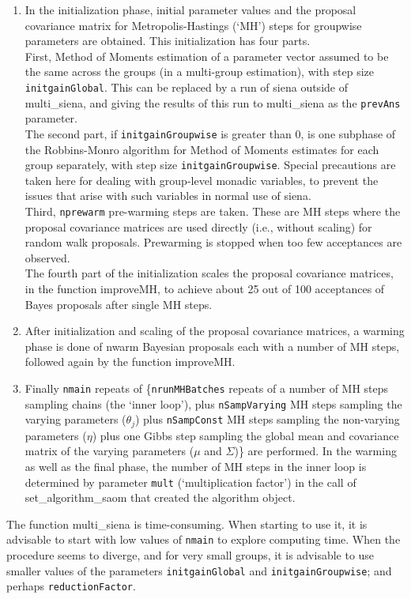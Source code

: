 \documentclass[a4paper,fleqn,11pt]{article}
\newcommand{\+}{\, + \,}
\newcommand{\sfn}[1]{\textsf{#1}}
\begin{document}
  \begin{enumerate}
  \item
  In the initialization phase, initial parameter values and the proposal
  covariance matrix for Metropolis-Hastings (`MH') steps for groupwise parameters
  are obtained.
  This initialization has four parts.\\
  First, Method of Moments estimation of a parameter vector
  assumed to be the same across the groups (in a multi-group estimation),
  with step size \texttt{initgainGlobal}.
  This can be replaced by a run of \textsf{siena} outside of \textsf{multi\_siena},
  and giving the results of this run to \textsf{multi\_siena}
  as the \texttt{prevAns} parameter.\\
  The second part, if \texttt{initgainGroupwise} is greater than 0,
  is one subphase of the Robbins-Monro algorithm for Method of
  Moments estimates for each group separately, with step size
  \texttt{initgainGroupwise}.
  Special precautions are taken here for dealing with group-level monadic variables,
  to prevent the issues that arise with such variables in normal use of \textsf{siena}.\\
  Third, \texttt{nprewarm} pre-warming steps are taken. These are MH steps where the
  proposal covariance matrices are used directly (i.e., without scaling)
  for random walk proposals. Prewarming is stopped when too few
  acceptances are observed.\\
  The fourth part of the initialization scales
  the proposal covariance matrices, in the
  function \sfn{improveMH}, to achieve about 25 out of 100 acceptances of
  Bayes proposals after single MH steps.
  \item
  After initialization and scaling of the proposal covariance matrices,
  a warming phase is done of \sfn{nwarm} Bayesian proposals
  each with a number of MH steps, followed again by the function \sfn{improveMH}.
  \item
  Finally \texttt{nmain} repeats of \Big\{\texttt{nrunMHBatches} repeats of a
  number of MH steps sampling chains (the `inner loop'),
  plus \texttt{nSampVarying} MH steps
  sampling the varying parameters ($\theta_j$) plus \texttt{nSampConst} MH steps
  sampling the non-varying parameters ($\eta$) plus one Gibbs
  step sampling the global mean and covariance matrix of the varying parameters
  ($\mu$ and $\Sigma$)\Big\} are performed.
  In the warming as well as the final phase,
  the number of MH steps in the inner loop is
  determined by parameter \texttt{mult} (`multiplication factor')
  in the call of \textsf{set\_algorithm\_saom} that created the algorithm object.
\end{enumerate}
  The function \textsf{multi\_siena} is time-consuming. When starting to use it,
  it is advisable
  to start with low values of \texttt{nmain} to explore computing time.
  When the procedure seems to diverge, and for very small groups, it is
  advisable to use smaller values of the parameters \texttt{initgainGlobal}
  and \texttt{initgainGroupwise}; and perhaps \texttt{reductionFactor}.
\end{document}
